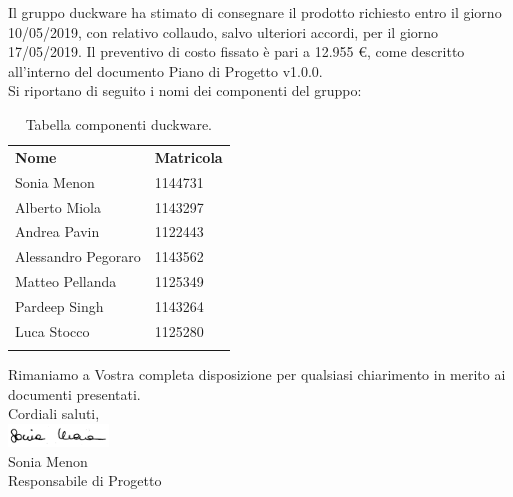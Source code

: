 \documentclass[a4paper,12pt]{article}
\begin{document}
Il gruppo duckware ha stimato di consegnare il prodotto richiesto entro il giorno 10/05/2019, con relativo collaudo, salvo ulteriori accordi, per il giorno 17/05/2019. Il preventivo di costo fissato è pari a 12.955 \euro, come descritto all’interno del documento Piano di Progetto v1.0.0.\\[0.5cm]
Si riportano di seguito i nomi dei componenti del gruppo:
\begin{center}
	\renewcommand{\arraystretch}{1.5}
	\begin{longtable}{  p{4cm}  p{2cm}  }
		\rowcolor{tableHeadYellow}
		\textbf{Nome}   & \textbf{Matricola} \\
		Sonia Menon & 1144731\\
		Alberto Miola & 1143297\\
		Andrea Pavin & 1122443\\
		Alessandro Pegoraro & 1143562\\
		Matteo Pellanda & 1125349\\
		Pardeep Singh & 1143264\\
		Luca Stocco & 1125280\\
		\rowcolor{white}
		\caption{Tabella componenti duckware.}
	\end{longtable}
\end{center}
Rimaniamo a Vostra completa disposizione per qualsiasi chiarimento in merito ai documenti presentati.\\[1.5cm]
Cordiali saluti,\\
\includegraphics[width=0.2\textwidth]{../images/firme/firma_sonia.png}\\
Sonia Menon\\
Responsabile di Progetto
\vfill
\end{document}
